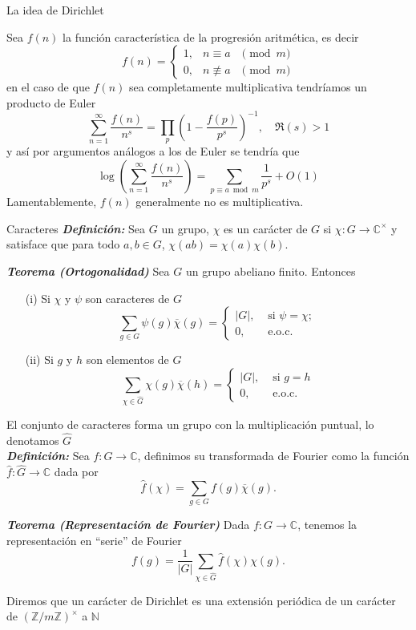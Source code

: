 \documentclass[final]{beamer}
\newcommand\C{\ensuremath{\mathbb{C}}}
\newlength{\colwidth}
\newcommand{\defi}[1]{\textbf{\emph{#1}}}
\begin{document}
\begin{frame}[t,fragile]
\begin{columns}[t]
\begin{column}{\colwidth}
\begin{alertblock}{La idea de Dirichlet}

Sea $f(n)$ la función característica de la progresión aritmética, es decir
$$
f(n)=\left\{\begin{array}{lll}
1, & n \equiv a & \pmod{m} \\
0, & n \not \equiv a & \pmod{m}
\end{array}\right.
$$
en el caso de que $f(n)$ sea completamente multiplicativa tendríamos un producto de Euler
$$
\sum_{n=1}^{\infty} \frac{f(n)}{n^s}=\prod_p\left(1-\frac{f(p)}{p^s}\right)^{-1}, \quad \Re(s)>1
$$
y así por argumentos análogos a los de Euler se tendría que
$$\log \left(\sum_{n=1}^{\infty} \frac{f(n)}{n^s}\right)=\sum_{p \equiv a\bmod{m}} \frac{1}{p^s}+O(1)$$
Lamentablemente, $f(n)$ generalmente no es multiplicativa.\\
  \end{alertblock}

\begin{block}{Caracteres}
\defi{Definición: }Sea $G$ un grupo, $\chi$ es un carácter de $G$ si $\chi: G\to \C^{\times}$ y satisface que para todo $a,b\in G$, $\chi(ab)=\chi(a)\chi(b)$.

\defi{Teorema (Ortogonalidad) } Sea $G$ un grupo abeliano finito. Entonces
\begin{itemize}
    \item[(i)] Si $\chi$ y $\psi$ son caracteres de $G$
$$
\sum_{g \in G} \psi(g) \overline{\chi}(g)= \begin{cases}|G|, & \text { si } \psi=\chi ; \\ 0, & \text { e.o.c. }\end{cases}
$$
\item[(ii)] Si $g$ y $h$ son elementos de $G$
$$
\sum_{\chi \in \widehat{G}} \chi(g) \overline{\chi}(h)= \begin{cases}|G|, & \text { si } g=h \\ 0, & \text { e.o.c. }\end{cases}
$$
\end{itemize}
El conjunto de caracteres forma un grupo con la multiplicación puntual, lo denotamos $\widehat{G}$\\
\vspace*{0.2cm}
\defi{Definición: }Sea $f: G \rightarrow \mathbb{C}$, definimos su transformada de Fourier como la función $\widehat{f}: \widehat{G} \rightarrow \mathbb{C}$ dada por
$$
\widehat{f}(\chi)=\sum_{g\in G} f(g) \overline{\chi}(g).
$$
\begin{exampleblock}{}
    \defi{Teorema (Representación de Fourier)} Dada $f: G \rightarrow \mathbb{C}$, tenemos la representación en ``serie'' de Fourier
$$
f(g)=\frac{1}{|G|}\sum_{\chi \in \widehat{G}}\widehat{f}(\chi) \chi(g).
$$
\end{exampleblock}
Diremos que un carácter de Dirichlet es una extensión periódica de un carácter de $(\mathbb{Z}/m\mathbb{Z})^{\times}$ a $\mathbb{N}$


\end{block}
\end{column}
\end{columns}
\end{frame}
\end{document}
